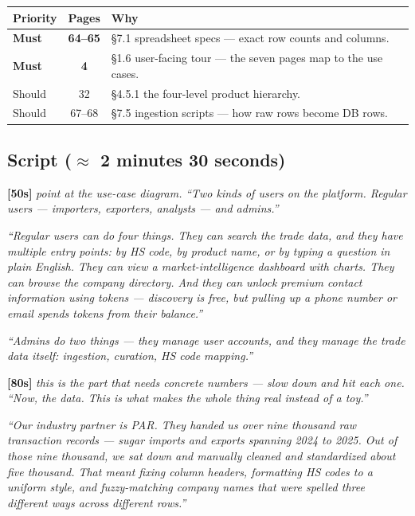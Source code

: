 \documentclass[11pt,a4paper]{article}
\newcommand{\beat}[1]{\textcolor{accent}{\textbf{[#1]}}}
\newcommand{\stage}[1]{{\itshape\color{stageborder}#1}}
\begin{document}
\begin{readbox}
\begin{tabularx}{\linewidth}{l c X}
\toprule
\textbf{Priority} & \textbf{Pages} & \textbf{Why} \\
\midrule
\textbf{Must}     & \textbf{64--65} & \S7.1 spreadsheet specs --- exact row counts and columns. \\
\textbf{Must}     & \textbf{4}      & \S1.6 user-facing tour --- the seven pages map to the use cases. \\
Should            & 32              & \S4.5.1 the four-level product hierarchy. \\
Should            & 67--68          & \S7.5 ingestion scripts --- how raw rows become DB rows. \\
\bottomrule
\end{tabularx}
\end{readbox}

\subsection*{Script ($\approx$ 2 minutes 30 seconds)}

\beat{50s} \stage{point at the use-case diagram.}
\textit{``Two kinds of users on the platform. Regular users --- importers, exporters, analysts --- and admins.''}

\textit{``Regular users can do four things. They can search the trade data, and they have multiple entry points: by HS code, by product name, or by typing a question in plain English. They can view a market-intelligence dashboard with charts. They can browse the company directory. And they can unlock premium contact information using tokens --- discovery is free, but pulling up a phone number or email spends tokens from their balance.''}

\textit{``Admins do two things --- they manage user accounts, and they manage the trade data itself: ingestion, curation, HS code mapping.''}

\vspace{0.4em}

\beat{80s} \stage{this is the part that needs concrete numbers --- slow down and hit each one.}
\textit{``Now, the data. This is what makes the whole thing real instead of a toy.''}

\textit{``Our industry partner is PAR. They handed us over nine thousand raw transaction records --- sugar imports and exports spanning 2024 to 2025. Out of those nine thousand, we sat down and manually cleaned and standardized about five thousand. That meant fixing column headers, formatting HS codes to a uniform style, and fuzzy-matching company names that were spelled three different ways across different rows.''}
\end{document}
